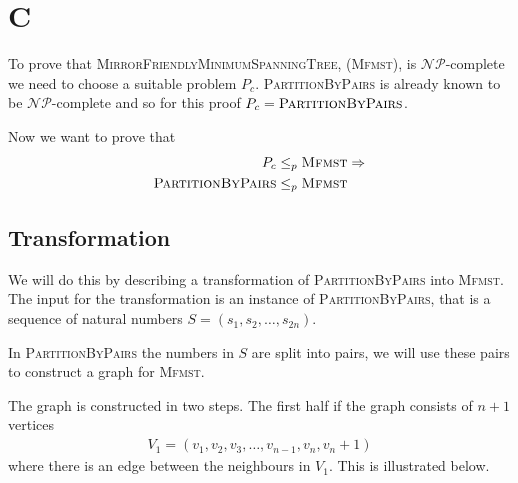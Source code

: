 \section{C}
To prove that \textsc{MirrorFriendlyMinimumSpanningTree}, (\textsc{Mfmst}), is $\mathcal{NP}$-complete we need to choose a suitable problem $P_c$. \textsc{PartitionByPairs} is already known to be $\mathcal{NP}$-complete and so for this proof $P_c = \textsc{PartitionByPairs}$.

Now we want to prove that
\begin{align*}
    P_c &\leq_p \textsc{Mfmst} \Rightarrow \\
    \textsc{PartitionByPairs} &\leq_p \textsc{Mfmst}
\end{align*}

\subsection{Transformation}
We will do this by describing a transformation of \textsc{PartitionByPairs} into \textsc{Mfmst}. The input for the transformation is an instance of \textsc{PartitionByPairs}, that is a sequence of natural numbers $S = \left(s_1,s_2,\ldots,s_{2n} \right)$.

In \textsc{PartitionByPairs} the numbers in $S$ are split into pairs, we will use these pairs to construct a graph for \textsc{Mfmst}. 

The graph is constructed in two steps. The first half if the graph consists of $n+1$ vertices
\begin{align*}
    V_1 = (v_1,v_2,v_3,\ldots,v_{n-1},v_n,v_n+1)
\end{align*}
where there is an edge between the neighbours in $V_1$. This is illustrated below.

\noindent\begin{minipage}{\textwidth}
	\centering
\end{minipage}
\\

